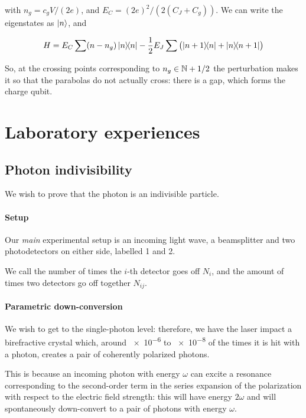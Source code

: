 \documentclass[main.tex]{subfiles}
\begin{document}
with \(n_g = c_g V /(2e)\), and \(E_C = (2e)^2 / (2(C_J + C_g))\). We can write the eigenstates as \(\ket{n} \), and

\begin{equation}
    H = E_C \sum  (n-n_g) \dyad{n} - \frac{1}{2} E_J \sum \qty(\ketbra{n+1}{n} + \ketbra{n}{n+1}  )
\end{equation}

So, at the crossing points corresponding to \(n_g \in \mathbb{N} + 1/2\) the perturbation makes it so that the parabolas do not actually cross: there is a gap, which forms the charge qubit.

\section{Laboratory experiences}

\subsection{Photon indivisibility}

We wish to prove that the photon is an indivisible particle.

\paragraph{Setup}

Our \emph{main}  experimental setup is an incoming light wave,
a beamsplitter and two photodetectors on either side, labelled 1 and 2.

We call the number of times the \(i\)-th detector goes off \(N_i\), and the amount of times two detectors go off together \(N_{ij}\).

\paragraph{Parametric down-conversion}

We wish to get to the single-photon level: therefore, we have the laser impact a birefractive crystal which, around \SI{e-6}{} to \SI{e-8}{} of the times it is hit with a photon, creates a pair of coherently polarized photons.

This is because an incoming photon with energy \(\omega\) can excite a resonance corresponding to the second-order term in the series expansion of the polarization with respect to the electric field strength: this will have energy \(2 \omega\) and will spontaneously down-convert to a pair of photons with energy \(\omega\).
\end{document}
